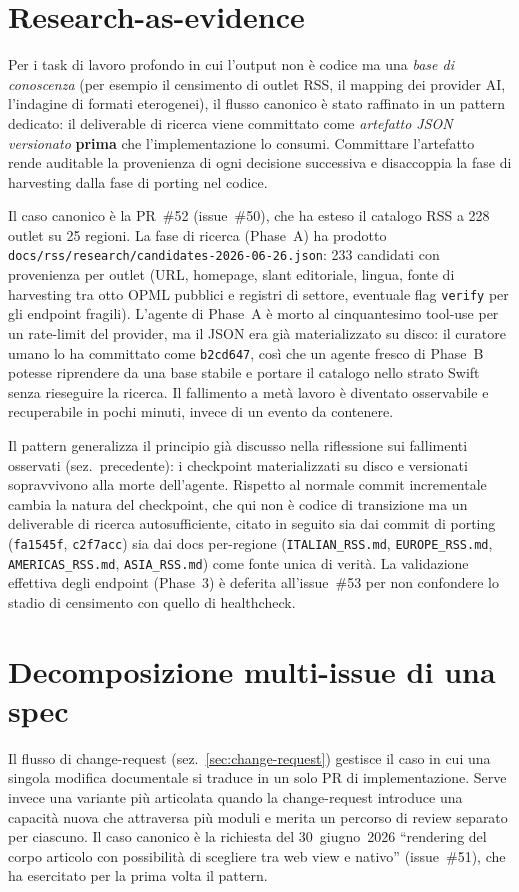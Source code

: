 \section{Research-as-evidence}
\label{sec:research-as-evidence}
Per i task di lavoro profondo in cui l'output non è codice ma una
\emph{base di conoscenza} (per esempio il censimento di outlet RSS, il
mapping dei provider AI, l'indagine di formati eterogenei), il flusso
canonico è stato raffinato in un pattern dedicato: il deliverable di
ricerca viene committato come \emph{artefatto JSON versionato}
\textbf{prima} che l'implementazione lo consumi. Committare l'artefatto
rende auditable la provenienza di ogni decisione successiva e disaccoppia
la fase di harvesting dalla fase di porting nel codice.

Il caso canonico è la PR~\#52 (issue~\#50), che ha esteso il catalogo
RSS a 228 outlet su 25 regioni. La fase di ricerca (Phase~A) ha
prodotto \texttt{docs/rss/research/candidates-2026-06-26.json}:
233 candidati con provenienza per outlet (URL, homepage, slant
editoriale, lingua, fonte di harvesting tra otto OPML pubblici e
registri di settore, eventuale flag \texttt{verify} per gli endpoint
fragili). L'agente di Phase~A è morto al cinquantesimo tool-use per un
rate-limit del provider, ma il JSON era già materializzato su disco:
il curatore umano lo ha committato come \texttt{b2cd647}, così che un
agente fresco di Phase~B potesse riprendere da una base stabile e
portare il catalogo nello strato Swift senza rieseguire la ricerca. Il
fallimento a metà lavoro è diventato osservabile e recuperabile in
pochi minuti, invece di un evento da contenere.

Il pattern generalizza il principio già discusso nella riflessione
sui fallimenti osservati (sez.~precedente): i checkpoint materializzati
su disco e versionati sopravvivono alla morte dell'agente. Rispetto al
normale commit incrementale cambia la natura del checkpoint, che qui
non è codice di transizione ma un deliverable di ricerca autosufficiente,
citato in seguito sia dai commit di porting (\texttt{fa1545f},
\texttt{c2f7acc}) sia dai docs per-regione (\texttt{ITALIAN\_RSS.md},
\texttt{EUROPE\_RSS.md}, \texttt{AMERICAS\_RSS.md}, \texttt{ASIA\_RSS.md})
come fonte unica di verità. La validazione effettiva degli endpoint
(Phase~3) è deferita all'issue~\#53 per non confondere lo stadio
di censimento con quello di healthcheck.

\section{Decomposizione multi-issue di una spec}
\label{sec:decomposizione-multi-issue}
Il flusso di change-request (sez.~\ref{sec:change-request}) gestisce
il caso in cui una singola modifica documentale si traduce in un solo
PR di implementazione. Serve invece una variante più articolata quando
la change-request introduce una capacità nuova che attraversa più moduli
e merita un percorso di review separato per ciascuno. Il caso canonico è
la richiesta del 30~giugno~2026 ``rendering del corpo articolo con
possibilità di scegliere tra web view e nativo'' (issue~\#51), che ha
esercitato per la prima volta il pattern.

